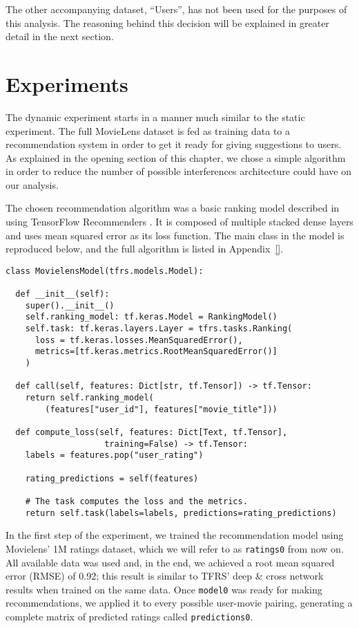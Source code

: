 The other accompanying dataset, ``Users'', has not been used for the purposes of
this analysis. The reasoning behind this decision will be explained in greater
detail in the next section.

\section{Experiments}
\label{sec:experiments04}

The dynamic experiment starts in a manner much similar to the static experiment.
The full MovieLens dataset is fed as training data to a recommendation system in
order to get it ready for giving suggestions to users. As explained in the
opening section of this chapter, we chose a simple algorithm in order to reduce
the number of possible interferences architecture could have on our analysis.

The chosen recommendation algorithm was a basic ranking model described in
\citet{} using TensorFlow Recommenders \citep{}. It is composed of multiple
stacked dense layers and uses mean squared error as its loss function. The main
class in the model is reproduced below, and the full algorithm is listed in
Appendix~\ref{}.


\begin{verbatim}
class MovielensModel(tfrs.models.Model):

  def __init__(self):
    super().__init__()
    self.ranking_model: tf.keras.Model = RankingModel()
    self.task: tf.keras.layers.Layer = tfrs.tasks.Ranking(
      loss = tf.keras.losses.MeanSquaredError(),
      metrics=[tf.keras.metrics.RootMeanSquaredError()]
    )

  def call(self, features: Dict[str, tf.Tensor]) -> tf.Tensor:
    return self.ranking_model(
        (features["user_id"], features["movie_title"]))

  def compute_loss(self, features: Dict[Text, tf.Tensor],
                    training=False) -> tf.Tensor:
    labels = features.pop("user_rating")

    rating_predictions = self(features)

    # The task computes the loss and the metrics.
    return self.task(labels=labels, predictions=rating_predictions)
\end{verbatim}

In the first step of the experiment, we trained the recommendation model using
Movielens' 1M ratings dataset, which we will refer to as \verb|ratings0| from
now on. All available data was used and, in the end, we achieved a root mean
squared error (RMSE) of 0.92; this result is similar to TFRS' deep \& cross
network \citep{} results when trained on the same data. Once \verb|model0| was
ready for making recommendations, we applied it to every possible user-movie
pairing, generating a complete matrix of predicted ratings called
\verb|predictions0|.

